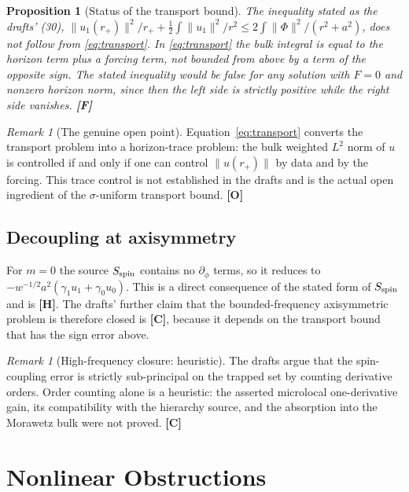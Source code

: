 \documentclass[11pt,a4paper]{article}
\newcommand{\VH}{\textcolor{vh}{\textbf{[H]}}}
\newcommand{\CC}{\textcolor{cc}{\textbf{[C]}}}
\newcommand{\FF}{\textcolor{ff}{\textbf{[F]}}}
\newcommand{\OO}{\textcolor{oo}{\textbf{[O]}}}
\newtheorem{proposition}[theorem]{Proposition}
\theoremstyle{remark}
\newtheorem{remark}[theorem]{Remark}
\theoremstyle{definition}
\begin{document}
\begin{proposition}[Status of the transport bound]
\label{prop:transport}
The inequality stated as the drafts' (30), $\|u_1(r_+)\|^2/r_+ + \tfrac12\int\|u_1\|^2/r^2 \le 2\int\|\Phi\|^2/(r^2+a^2)$, does not follow from \eqref{eq:transport}. In \eqref{eq:transport} the bulk integral is \emph{equal to} the horizon term plus a forcing term, not bounded from above by a term of the opposite sign. The stated inequality would be false for any solution with $F = 0$ and nonzero horizon norm, since then the left side is strictly positive while the right side vanishes. \FF
\end{proposition}

\begin{remark}[The genuine open point]
\label{rem:transport}
Equation~\eqref{eq:transport} converts the transport problem into a horizon-trace problem: the bulk weighted $L^2$ norm of $u$ is controlled if and only if one can control $\|u(r_+)\|$ by data and by the forcing. This trace control is not established in the drafts and is the actual open ingredient of the $\sigma$-uniform transport bound. \OO
\end{remark}

\subsection{Decoupling at axisymmetry}

For $m = 0$ the source $S_{\rm spin}$ contains no $\partial_\phi$ terms, so it reduces to $-w^{-1/2}a^2(\gamma_1 u_1 + \gamma_0 u_0)$. This is a direct consequence of the stated form of $S_{\rm spin}$ and is \VH. The drafts' further claim that the bounded-frequency axisymmetric problem is therefore closed is \CC, because it depends on the transport bound that has the sign error above.

\begin{remark}[High-frequency closure: heuristic]
The drafts argue that the spin-coupling error is strictly sub-principal on the trapped set by counting derivative orders. Order counting alone is a heuristic: the asserted microlocal one-derivative gain, its compatibility with the hierarchy source, and the absorption into the Morawetz bulk were not proved. \CC
\end{remark}

\section{Nonlinear Obstructions}
\label{sec:nonlinear}
\end{document}
